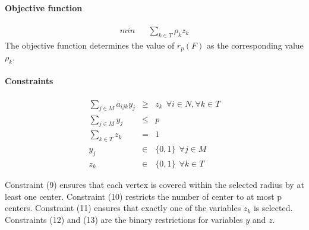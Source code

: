 \documentclass[a4paper,10pt]{article}
\begin{document}
	\paragraph{Objective function}
	\begin{eqnarray}
		min && \sum_{k \in T} \rho_{k} z_{k}	
	\end{eqnarray}
	The objective function determines the value of $r_p(F)$ as the corresponding value $\rho_k$.
	
	\paragraph{Constraints}
	\begin{eqnarray}
    	\sum_{j \in M} a_{ijk} y_{j} &\geq& z_k ~~\forall i \in N, \forall k \in T \\
		\sum_{j \in M} y_{j} &\leq& p \\
		\sum_{k \in T} z_{k} &=& 1 \\
		y_j &\in& \{ 0,1 \} ~~\forall j \in M \\
		z_{k} &\in& \{0 , 1 \} ~~\forall k \in T 
	\end{eqnarray}
	
	Constraint (9) ensures that each vertex is covered within the selected radius by at least one center.
	Constraint (10) restricts the number of center to at most p centers.
	Constraint (11) ensures that exactly one of the variables $z_k$ is selected. 
	Constraints (12) and (13) are the binary restrictions for variables $y$ and $z$. 
	
\end{document}
